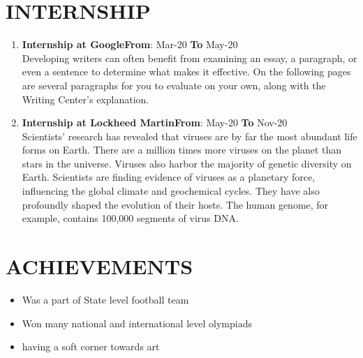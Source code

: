 \documentclass{article}
\begin{document}
\vspace{3pt}
\section*{\large{\uppercase{Internship}}}

\vspace{3pt}
\begin{enumerate}
	\item {\textbf{Internship at Google}}\hfill {\textbf{From}}: Mar-20 {\textbf{To}} May-20\\
	Developing writers can often benefit from examining an essay, a paragraph, or even a sentence to determine what makes it effective. On the following pages are several paragraphs for you to evaluate on your own, along with the Writing Center's explanation.
	\item {\textbf{Internship at Lockheed Martin}}\hfill {\textbf{From}}: May-20 {\textbf{To}} Nov-20\\
	 Scientists' research has revealed that viruses are by far the most abundant life forms on Earth. There are a million times more viruses on the planet than stars in the universe. Viruses also harbor the majority of genetic diversity on Earth. Scientists are finding evidence of viruses as a planetary force, influencing the global climate and geochemical cycles. They have also profoundly shaped the evolution of their hosts. The human genome, for example, contains 100,000 segments of virus DNA.
\end{enumerate}

\vspace{3pt}


\section*{\large{\uppercase{achievements}}}

\vspace{3pt}
\begin{itemize}[noitemsep,nolistsep]
	\item Was a part of State level football team
	\item Won many national and international level olympiads
	\item having a soft corner towards art
\end{itemize}

\vspace{3pt}
\end{document}
